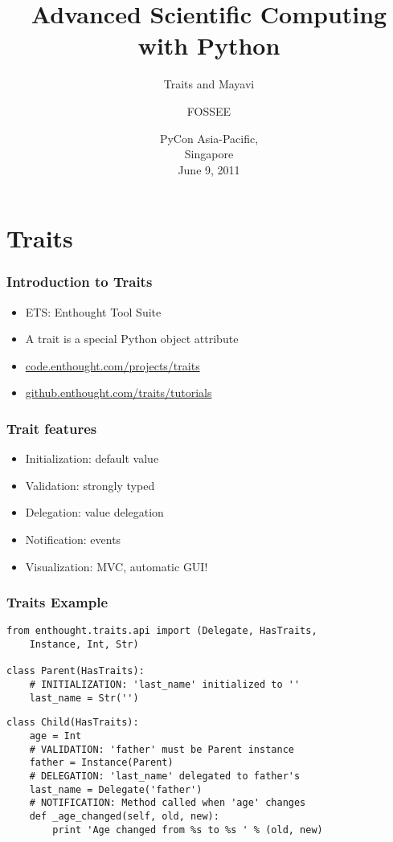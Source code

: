 \documentclass[14pt,compress]{beamer}
\title[Advanced Sci Comp.]{Advanced Scientific Computing with
Python}
\subtitle{Traits and Mayavi}
\author[FOSSEE] {FOSSEE}
\institute[IIT Bombay] {Department of Aerospace Engineering\\IIT Bombay}
\date[] {PyCon Asia-Pacific,\\
Singapore\\
June 9, 2011
}
\begin{document}
\begin{frame}
  \maketitle
\end{frame}

\section{Traits}

\begin{frame}
  \frametitle{Introduction to Traits}
  \begin{itemize}
    \item ETS: Enthought Tool Suite
    \item A \alert{trait} is a \alert{special} Python object attribute
        \vspace*{2em}

    \item \url{code.enthought.com/projects/traits}
    \item \url{github.enthought.com/traits/tutorials}

  \end{itemize}
\end{frame}

\begin{frame}
  \frametitle{Trait features}
  \begin{itemize}
    \item Initialization: default value
    \item Validation: strongly typed
    \item Delegation: value delegation
    \item Notification: events
    \item Visualization: MVC, automatic GUI!
  \end{itemize}
\end{frame}

\begin{frame}
  \frametitle{Traits Example}
\vspace*{-16pt}
\footnotesize
\begin{lstlisting}
from enthought.traits.api import (Delegate, HasTraits, 
    Instance, Int, Str)

class Parent(HasTraits):
    # INITIALIZATION: 'last_name' initialized to ''
    last_name = Str('') 
\end{lstlisting}
\pause
\begin{lstlisting}
class Child(HasTraits):
    age = Int
    # VALIDATION: 'father' must be Parent instance
    father = Instance(Parent)
    # DELEGATION: 'last_name' delegated to father's 
    last_name = Delegate('father') 
    # NOTIFICATION: Method called when 'age' changes
    def _age_changed(self, old, new): 
        print 'Age changed from %s to %s ' % (old, new)
\end{lstlisting}
\end{frame}
\end{document}
